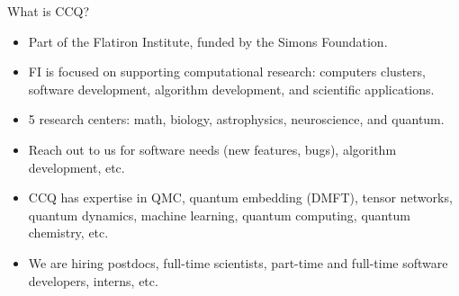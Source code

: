 \begin{frame}{What is CCQ?}

\begin{itemize}[<+->]

\item Part of the Flatiron Institute, funded by the Simons Foundation.
\item FI is focused on supporting computational research: computers clusters, software development, algorithm development, and scientific applications.
\item 5 research centers: math, biology, astrophysics, neuroscience, and quantum.
\item Reach out to us for software needs (new features, bugs), algorithm development, etc.
\item CCQ has expertise in QMC, quantum embedding (DMFT), tensor networks, quantum dynamics, machine learning, quantum computing, quantum chemistry, etc.
\item We are hiring postdocs, full-time scientists, part-time and full-time software developers, interns, etc.

\end{itemize}

\end{frame}

